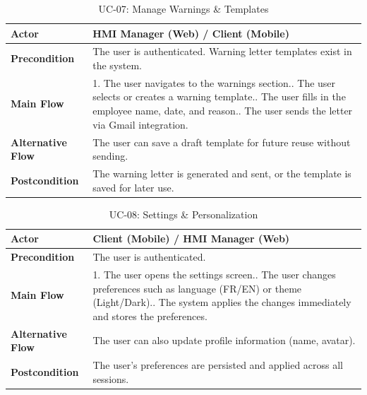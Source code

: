 \begin{table}[H]
\centering
\caption{UC-07: Manage Warnings \& Templates}
\label{tab:uc07}
\begin{tabular}{|l|p{10cm}|}
\hline
\textbf{Actor} & HMI Manager (Web) / Client (Mobile) \\
\hline
\textbf{Precondition} & The user is authenticated. Warning letter templates exist in the system. \\
\hline
\textbf{Main Flow} & 1. The user navigates to the warnings section.\newline 2. The user selects or creates a warning template.\newline 3. The user fills in the employee name, date, and reason.\newline 4. The user sends the letter via Gmail integration. \\
\hline
\textbf{Alternative Flow} & The user can save a draft template for future reuse without sending. \\
\hline
\textbf{Postcondition} & The warning letter is generated and sent, or the template is saved for later use. \\
\hline
\end{tabular}
\end{table}

\begin{table}[H]
\centering
\caption{UC-08: Settings \& Personalization}
\label{tab:uc08}
\begin{tabular}{|l|p{10cm}|}
\hline
\textbf{Actor} & Client (Mobile) / HMI Manager (Web) \\
\hline
\textbf{Precondition} & The user is authenticated. \\
\hline
\textbf{Main Flow} & 1. The user opens the settings screen.\newline 2. The user changes preferences such as language (FR/EN) or theme (Light/Dark).\newline 3. The system applies the changes immediately and stores the preferences. \\
\hline
\textbf{Alternative Flow} & The user can also update profile information (name, avatar). \\
\hline
\textbf{Postcondition} & The user's preferences are persisted and applied across all sessions. \\
\hline
\end{tabular}
\end{table}

